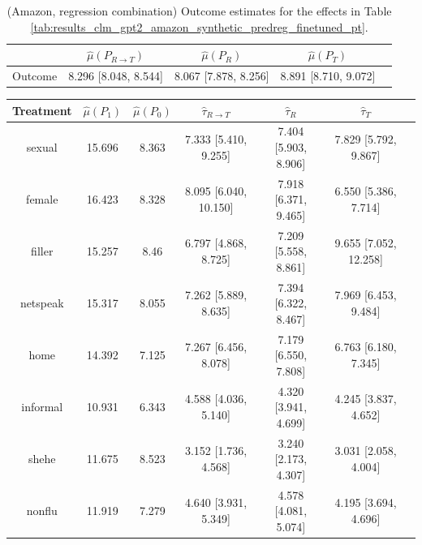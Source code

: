 \documentclass{article}
\begin{document}
\begin{table}[!ht]
\centering
\begin{tabular}{c|cccc}
\toprule
    & $\hat{\mu}(P_{R \rightarrow T})$   & $\hat{\mu}(P_R)$     & $\hat{\mu}(P_T)$     \\
\midrule
    Outcome & 8.296 [8.048, 8.544]               & 8.067 [7.878, 8.256] & 8.891 [8.710, 9.072] \\
\bottomrule
\end{tabular}
\caption{(Amazon, regression combination) Outcome estimates for the effects in Table \ref{tab:results_clm_gpt2_amazon_synthetic_predreg_finetuned_pt}.}
\label{tab:results_clm_gpt2_amazon_synthetic_predreg_finetuned_pt_outcome}
\end{table}

\begin{table}[!ht]
    \centering
    \begin{tabular}{c|cccccc}
\toprule
    Treatment   &   $\hat{\mu}(P_1)$ &   $\hat{\mu}(P_0)$ & $\hat{\tau}_{R \rightarrow T}$   & $\hat{\tau}_R$       & $\hat{\tau}_T$        \\
\midrule
    sexual      &             15.696 &              8.363 & 7.333 [5.410, 9.255]             & 7.404 [5.903, 8.906] & 7.829 [5.792, 9.867]  \\
    female      &             16.423 &              8.328 & 8.095 [6.040, 10.150]            & 7.918 [6.371, 9.465] & 6.550 [5.386, 7.714]  \\
    filler      &             15.257 &              8.46  & 6.797 [4.868, 8.725]             & 7.209 [5.558, 8.861] & 9.655 [7.052, 12.258] \\
    netspeak    &             15.317 &              8.055 & 7.262 [5.889, 8.635]             & 7.394 [6.322, 8.467] & 7.969 [6.453, 9.484]  \\
    home        &             14.392 &              7.125 & 7.267 [6.456, 8.078]             & 7.179 [6.550, 7.808] & 6.763 [6.180, 7.345]  \\
    informal    &             10.931 &              6.343 & 4.588 [4.036, 5.140]             & 4.320 [3.941, 4.699] & 4.245 [3.837, 4.652]  \\
    shehe       &             11.675 &              8.523 & 3.152 [1.736, 4.568]             & 3.240 [2.173, 4.307] & 3.031 [2.058, 4.004]  \\
    nonflu      &             11.919 &              7.279 & 4.640 [3.931, 5.349]             & 4.578 [4.081, 5.074] & 4.195 [3.694, 4.696]  \\

\end{tabular}
\end{table}
\end{document}
